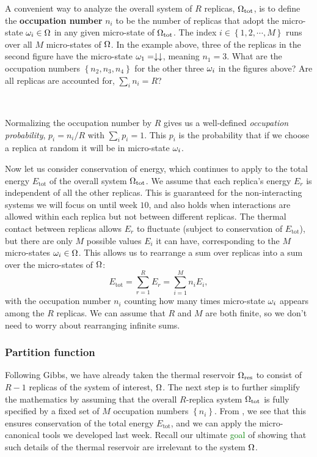 A convenient way to analyze the overall system of $R$ replicas, $\Omega_{\text{tot}}$, is to define the \textbf{occupation number} $n_i$ to be the number of replicas that adopt the micro-state $\omega_i \in \Omega$ in any given micro-state of $\Omega_{\text{tot}}$.
The index $i \in \left\{1, 2, \cdots, M\right\}$ runs over all $M$ micro-states of $\Omega$.
In the example above, three of the replicas in the second figure have the micro-state $\omega_1 = \downarrow\downarrow$, meaning $n_1 = 3$.
What are the occupation numbers $\left\{n_2, n_3, n_4\right\}$ for the other three $\omega_i$ in the figures above?
Are all replicas are accounted for, $\sum_i n_i = R$?
\begin{mdframed}
  \ \\[50 pt]
\end{mdframed}
Normalizing the occupation number by $R$ gives us a well-defined \textit{occupation probability}, $p_i = n_i / R$ with $\sum_i p_i = 1$.
This $p_i$ is the probability that if we choose a replica at random it will be in micro-state $\omega_i$.

Now let us consider conservation of energy, which continues to apply to the total energy $E_{\text{tot}}$ of the overall system $\Omega_{\text{tot}}$.
We assume that each replica's energy $E_r$ is independent of all the other replicas.
This is guaranteed for the non-interacting systems we will focus on until week $10$, and also holds when interactions are allowed within each replica but not between different replicas.
The thermal contact between replicas allows $E_r$ to fluctuate (subject to conservation of $E_{\text{tot}}$), but there are only $M$ possible values $E_i$ it can have, corresponding to the $M$ micro-states $\omega_i \in \Omega$.
This allows us to rearrange a sum over replicas into a sum over the micro-states of $\Omega$:
\begin{equation}
  \label{eq:canon_Etot}
  E_{\text{tot}} = \sum_{r = 1}^R E_r = \sum_{i = 1}^M n_i E_i,
\end{equation}
with the occupation number $n_i$ counting how many times micro-state $\omega_i$ appears among the $R$ replicas.
We can assume that $R$ and $M$ are both finite, so we don't need to worry about rearranging infinite sums.



\subsubsection{\label{sec:canon_part}Partition function}
Following Gibbs, we have already taken the thermal reservoir $\Omega_{\text{res}}$ to consist of $R - 1$ replicas of the system of interest, $\Omega$.
The next step is to further simplify the mathematics by assuming that the overall $R$-replica system $\Omega_{\text{tot}}$ is fully specified by a fixed set of $M$ occupation numbers $\left\{n_i\right\}$.
From , we see that this ensures conservation of the total energy $E_{\text{tot}}$, and we can apply the micro-canonical tools we developed last week.
Recall our ultimate \textcolor{green}{goal} of showing that such details of the thermal reservoir are irrelevant to the system $\Omega$.

